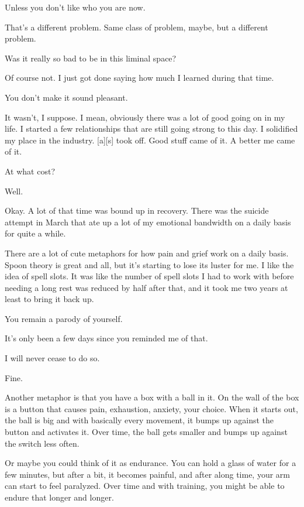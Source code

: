 \begin{paracol}{2}
\begin{leftcolumn}
\begin{ally}
Unless you don't like who you are now.
\end{ally}
That's a different problem. Same class of problem, maybe, but a different problem.
\newpage

\begin{ally}
Was it really so bad to be in this liminal space?
\end{ally}
Of course not. I just got done saying how much I learned during that time.

\begin{ally}
You don't make it sound pleasant.
\end{ally}
It wasn't, I suppose. I mean, obviously there was a lot of good going on in my life. I started a few relationships that are still going strong to this day. I solidified my place in the industry. {[}a{]}{[}s{]} took off. Good stuff came of it. A better me came of it.

\begin{ally}
At what cost?
\end{ally}
Well.

Okay. A lot of that time was bound up in recovery. There was the suicide attempt in March that ate up a lot of my emotional bandwidth on a daily basis for quite a while.

There are a lot of cute metaphors for how pain and grief work on a daily basis. Spoon theory is great and all, but it's starting to lose its luster for me. I like the idea of spell slots. It was like the number of spell slots I had to work with before needing a long rest was reduced by half after that, and it took me two years at least to bring it back up.

\begin{ally}
You remain a parody of yourself.
\end{ally}
It's only been a few days since you reminded me of that.

\begin{ally}
I will never cease to do so.
\end{ally}
Fine.

Another metaphor is that you have a box with a ball in it. On the wall of the box is a button that causes pain, exhaustion, anxiety, your choice. When it starts out, the ball is big and with basically every movement, it bumps up against the button and activates it. Over time, the ball gets smaller and bumps up against the switch less often.

Or maybe you could think of it as endurance. You can hold a glass of water for a few minutes, but after a bit, it becomes painful, and after along time, your arm can start to feel paralyzed. Over time and with training, you might be able to endure that longer and longer.


\end{leftcolumn}
\end{paracol}
